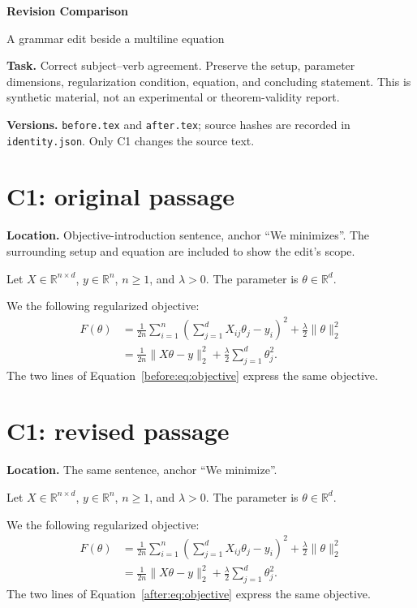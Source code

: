 \documentclass[11pt]{article}
\begin{document}
{\LARGE\bfseries Revision Comparison}\par
{\large A grammar edit beside a multiline equation}

\textbf{Task.} Correct subject--verb agreement. Preserve the setup, parameter
dimensions, regularization condition, equation, and concluding statement.
This is synthetic material, not an experimental or theorem-validity report.

\textbf{Versions.} \texttt{before.tex} and \texttt{after.tex}; source hashes are
recorded in \texttt{identity.json}. Only C1 changes the source text.

\section*{C1: original passage}
\textbf{Location.} Objective-introduction sentence, anchor ``We minimizes''.
The surrounding setup and equation are included to show the edit's scope.

\renewcommand{\theequation}{B\arabic{equation}}
\renewcommand{\theHequation}{before.\arabic{equation}}
\setcounter{equation}{0}
Let $X\in\mathbb{R}^{n\times d}$, $y\in\mathbb{R}^{n}$,
$n\geq 1$, and $\lambda>0$. The parameter is $\theta\in\mathbb{R}^d$.

We  the following regularized objective:
\begin{align}
F(\theta)
 &= \frac{1}{2n}\sum_{i=1}^{n}
    \left(\sum_{j=1}^{d}X_{ij}\theta_j-y_i\right)^2
    +\frac{\lambda}{2}\|\theta\|_2^2 \label{before:eq:objective}\\
 &= \frac{1}{2n}\|X\theta-y\|_2^2
    +\frac{\lambda}{2}\sum_{j=1}^{d}\theta_j^2. \nonumber
\end{align}
The two lines of Equation~\eqref{before:eq:objective} express the same objective.

\newpage
\section*{C1: revised passage}
\textbf{Location.} The same sentence, anchor ``We minimize''.

\renewcommand{\theequation}{A\arabic{equation}}
\renewcommand{\theHequation}{after.\arabic{equation}}
\setcounter{equation}{0}
Let $X\in\mathbb{R}^{n\times d}$, $y\in\mathbb{R}^{n}$,
$n\geq 1$, and $\lambda>0$. The parameter is $\theta\in\mathbb{R}^d$.

We  the following regularized objective:
\begin{align}
F(\theta)
 &= \frac{1}{2n}\sum_{i=1}^{n}
    \left(\sum_{j=1}^{d}X_{ij}\theta_j-y_i\right)^2
    +\frac{\lambda}{2}\|\theta\|_2^2 \label{after:eq:objective}\\
 &= \frac{1}{2n}\|X\theta-y\|_2^2
    +\frac{\lambda}{2}\sum_{j=1}^{d}\theta_j^2. \nonumber
\end{align}
The two lines of Equation~\eqref{after:eq:objective} express the same objective.
\end{document}
